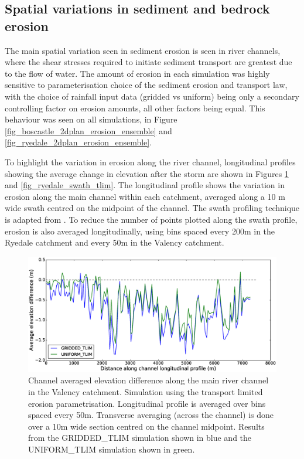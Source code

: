 \subsection{Spatial variations in sediment and bedrock erosion}
The main spatial variation seen in sediment erosion is seen in river channels, where the shear stresses required to initiate sediment transport are greatest due to the flow of water. The amount of erosion in each simulation was highly sensitive to parameterisation choice of the sediment erosion and transport law, with the choice of rainfall input data (gridded vs uniform) being only a secondary controlling factor on erosion amounts, all other factors being equal. This behaviour was seen on all simulations, in Figure \ref{fig_boscastle_2dplan_erosion_ensemble} and \ref{fig_ryedale_2dplan_erosion_ensemble}. 

To highlight the variation in erosion along the river channel, longitudinal profiles showing the average change in elevation after the storm are shown in Figures \ref{fig_boscastle_swath_tlim} and \ref{fig_ryedale_swath_tlim}. The longitudinal profile shows the variation in erosion along the main channel within each catchment, averaged along a 10 m wide swath centred on the midpoint of the channel. The swath profiling technique is adapted from \citep{hergarten2014extracting}. To reduce the number of points plotted along the swath profile, erosion is also averaged longitudinally, using bins spaced every 200m in the Ryedale catchment and every 50m in the Valency catchment.

\begin{figure}[htb]
\includegraphics[width=14cm]{chp06_figures_scripts/fig_swath_profile_boscastle_erode_tlim.eps}
\caption{Channel averaged elevation difference along the main river channel in the Valency catchment. Simulation using the transport limited erosion parametrisation. Longitudinal profile is averaged over bins spaced every 50m. Transverse averaging (across the channel) is done over a 10m wide section centred on the channel midpoint. Results from the GRIDDED\_TLIM simulation shown in blue and the UNIFORM\_TLIM simulation shown in green.}
\label{fig_boscastle_swath_tlim}
\end{figure}


